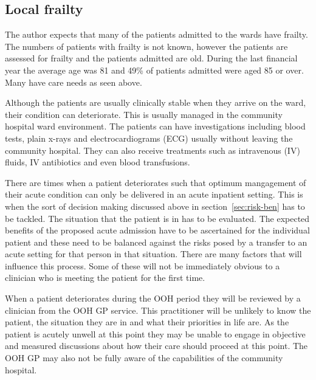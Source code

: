 \documentclass
[
	12pt,
	a4paper,
	oneside,
]{report}
\begin{document}
\subsection{Local frailty}

The author expects that many of the patients admitted to the wards have frailty.
The numbers of patients with frailty is not known, however the patients are assessed 
for frailty and the patients admitted are old. During the last financial year the
average age was 81 and 49\% of patients admitted were aged 85 or over. Many have 
care needs as seen above.

Although the patients are usually clinically stable when they arrive on the ward,
their condition can deteriorate. This is usually managed in the community hospital
ward environment. The patients can have investigations including blood tests, plain
x-rays and electrocardiograms (ECG) usually without leaving the community hospital.
They can also receive treatments such as intravenous (IV) fluids, IV antibiotics
and even blood transfusions.

There are times when a patient deteriorates such that optimum mangagement of their
acute condition can only be delivered in an acute inpatient setting. This is when 
the sort of decision making discussed above in section~\ref{sec:risk-ben} has
to be tackled. The situation that the patient is in has to be evaluated. The 
expected benefits of the proposed acute admission have to be ascertained for the
individual patient and these need to be balanced against the risks posed by a transfer
to an acute setting for that person in that situation. There are many factors that 
will influence this process. Some of these will not be immediately obvious to a 
clinician who is meeting the patient for the first time.

When a patient deteriorates during the OOH period they will be reviewed by a clinician
from the OOH GP service. This practitioner will be unlikely to know the patient,
the situation they are in and what their priorities in life are. As the patient is
acutely unwell at this point they may be unable to engage in objective and measured
discussions about how their care should proceed at this point. The OOH GP may also
not be fully aware of the capabilities of the community hospital. 
\end{document}
